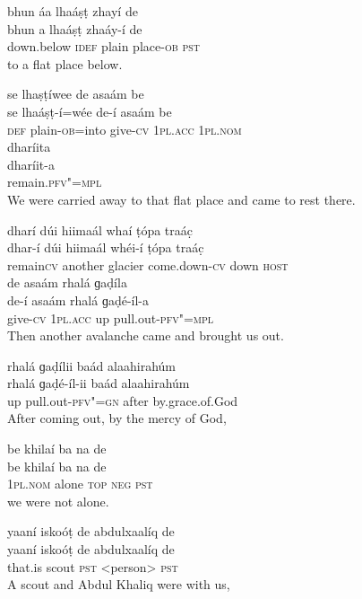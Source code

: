 \begin{exe}
\ex
\label{ex:13}
\glll bhun	áa	lhaáṣṭ	zhayí	de \\
bhun	a	lhaáṣṭ	zhaáy-í	de \\
down.below	\textsc{idef}	plain	place-\textsc{ob}	\textsc{pst} \\
\glt to a flat place below.

\ex
\label{ex:14}
\glll se	lhaṣṭíwee	de	asaám	be \\
se	lhaáṣṭ-í=wée	de-í	asaám	be \\
\textsc{def}	plain-\textsc{ob}=into	give-\textsc{cv} \textsc{1pl.acc} \textsc{1pl.nom} \\
\glll dharíita \\
dharíit-a \\
remain.\textsc{pfv"=mpl} \\
\glt We were carried away to that flat place and came to rest there.

\ex
\label{ex:15}
\glll dharí	dúi	hiimaál	whaí	ṭópa	traác̣  \\
dhar-í	dúi	hiimaál	whéi-í	ṭópa	traác̣  \\
remain\textsc{cv}	another	glacier	come.down-\textsc{cv}	down \textsc{host} \\
\glll de	asaám	rhalá	ɡaḍíla \\
de-í	asaám	rhalá	ɡaḍé-íl-a \\
give-\textsc{cv} \textsc{1pl.acc}	up	pull.out-\textsc{pfv"=mpl} \\
\glt Then another avalanche came and brought us out.

\ex
\label{ex:16}
\glll rhalá	ɡaḍílii	baád	alaahirahúm \\
rhalá	ɡaḍé-íl-ii	baád	alaahirahúm \\
up	pull.out-\textsc{pfv"=gn}	after	by.grace.of.God \\
\glt After coming out, by the mercy of God,
 
\ex
\label{ex:17}
\glll be	khilaí	ba	na	de \\
be	khilaí	ba	na	de \\
\textsc{1pl.nom}	alone \textsc{top} \textsc{neg} 	\textsc{pst} \\
\glt we were not alone.

\ex
\label{ex:18}
\glll yaaní	iskoóṭ	de	abdulxaalíq	de \\
yaaní	iskoóṭ	de	abdulxaalíq	de \\
that.is	scout \textsc{pst}	<person>	\textsc{pst} \\
\glt A scout and Abdul Khaliq were with us,


\end{exe}
